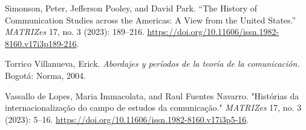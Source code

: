 \documentclass{tufte-handout}
\begin{document}
\begin{hangparas}{.25in}{1}
Simonson, Peter, Jefferson Pooley, and David Park. ``The History of
Communication Studies across the Americas: A View from the United
States.'' \emph{MATRIZes} 17, no. 3 (2023): 189--216.
\url{https://doi.org/10.11606/issn.1982-8160.v17i3p189-216}.

Torrico Villanueva, Erick. \emph{Abordajes y períodos de la teoría de la
comunicación.} Bogotá: Norma, 2004.

Vassallo de Lopes, Maria Immacolata, and Raul Fuentes Navarro.
"Histórias da internacionalização do campo de estudos da comunicação."
\emph{MATRIZes} 17, no. 3 (2023):
5--16. \url{https://doi.org/10.11606/issn.1982-8160.v17i3p5-16}.



\end{hangparas}
\end{document}
